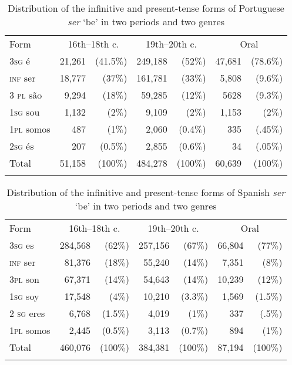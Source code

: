 \documentclass[output=paper,colorlinks,citecolor=brown]{langscibook}
\begin{document}
\begin{table}
\begin{tabular}{lrrrrrr}
\lsptoprule
{Form}& \multicolumn{2}{c}{{16th–18th c.}} & \multicolumn{2}{c}{{19th–20th c.}} & \multicolumn{2}{c}{{Oral}}  \\
\cmidrule(lr){1-1}\cmidrule(lr){2-3}\cmidrule(lr){4-5}\cmidrule(lr){6-7}
3\textsc{sg} é & 21,261 & (41.5$\%$)& 249,188 & (52$\%$) & 47,681 & (78.6$\%$)\\
\textsc{inf }ser & 18,777 & (37$\%$) & 161,781 & (33$\%$) & 5,808 & (9.6$\%$)\\
3\textsc{ pl} são & 9,294 & (18$\%$) & 59,285 & (12$\%$)& 5628 & (9.3$\%$)\\
1\textsc{sg} sou & 1,132 & (2$\%$) & 9,109 & (2$\%$) & 1,153 & (2$\%$)\\
1\textsc{pl} somos & 487 & (1$\%$) & 2,060 & (0.4$\%$)& 335 & (.45$\%$)\\
2\textsc{sg} és & 207 & (0.5$\%$) & 2,855 & (0.6$\%$) & 34 & (.05$\%$) \\
\midrule
Total &  51,158 & (100$\%$)& 484,278 & (100$\%$)& 60,639 & (100$\%$)\\
\lspbottomrule
\end{tabular}
\caption{Distribution of the infinitive and present-tense forms of Portuguese \textit{ser} `be' in two periods and two genres\label{tab:clements:5}}
\end{table}


\begin{table}
\begin{tabular}{lrrrrrr}
\lsptoprule
{Form}& \multicolumn{2}{c}{{16th--18th c.}} & \multicolumn{2}{c}{{19th--20th c.}} & \multicolumn{2}{c}{{Oral}}\\
\cmidrule(lr){1-1}\cmidrule(lr){2-3}\cmidrule(lr){4-5}\cmidrule(lr){6-7}
3\textsc{sg} es & 284,568 & (62$\%$) & 257,156 & (67$\%$) & 66,804 & (77$\%$)\\
\textsc{inf }ser & 81,376 & (18$\%$) & 55,240 & (14$\%$)& 7,351 & (8$\%$)\\
3\textsc{pl} son & 67,371 & (14$\%$) & 54,643 & (14$\%$) & 10,239 & (12$\%$)\\
1\textsc{sg} soy & 17,548 & (4$\%$) & 10,210 & (3.3$\%$)& 1,569 & (1.5$\%$)\\
2\textsc{ sg} eres & 6,768 & (1.5$\%$) & 4,019 & (1$\%$)& 337 & (.5$\%$)\\
1\textsc{pl} somos & 2,445 & (0.5$\%$)& 3,113 & (0.7$\%$) & 894 & (1$\%$)\\
\midrule
Total &  460,076 & (100$\%$) & 384,381 & (100$\%$)& 87,194 & (100$\%$)\\
\lspbottomrule
\end{tabular}
\caption{Distribution of the infinitive and present-tense forms of Spanish \textit{ser} `be' in two periods and two genres\label{tab:clements:6}}
\end{table}
\end{document}
